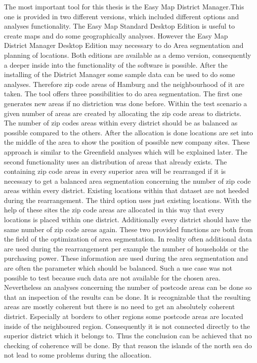 The most important tool for this thesis is the Easy Map District Manager.This one is provided in two different versions, which included different options and analyses functionality. The Easy Map Standard Desktop Edition is useful to create maps and do some geographically analyses. However the Easy Map District Manager Desktop Edition may necessary to do Area segmentation and planning of locations. Both editions are available as a demo version, consequently a deeper inside into the functionality of the software is possible. After the installing of the District Manager some sample data can be used to do some analyses. Therefore zip code areas of Hamburg and the neighbourhood of it are taken. The tool offers three possibilities to do area segmentation. The first one generates new areas if no distriction was done before. Within the test scenario a given number of areas are created by allocating the zip code areas to districts. The number of zip codes areas within every district should be as balanced as possible compared to the others. After the allocation is done locations are set into the middle of the area to show the position of possible new company sites. These approach is similar to the Greenfield analyses which will be explained later. The second functionality uses an distribution of areas that already exists. The containing zip code areas in every superior area will be rearranged if it is necessary to get a balanced area segmentation concerning the number of zip code areas within every district. Existing locations within that dataset are not heeded during the rearrangement. The third option uses just existing locations. With the help of these sites the zip code areas are allocated in this way that every locations is placed within one district. Additionally every district should have the same number of zip code areas again. These two provided functions are both from the field of the optimization of area segmentation. In reality often additional data are used during the rearrangement per example the number of households or the purchasing power. These information are used during the area segmentation and are often the parameter which should be balanced. Such a use case was not possible to test because such data are not available for the chosen area. Nevertheless an analyses concerning the number of postcode areas can be done so that an inspection of the results can be done. It is recognizable that the resulting areas are mostly coherent but there is no need to get an absolutely coherent district. Especially at borders to other regions some postcode areas are located inside of the neighboured region. Consequently it is not connected directly to the superior district which it belongs to. Thus the conclusion can be achieved that no checking of coherence will be done. By that reason the islands of the north sea do not lead to some problems during the allocation. 

